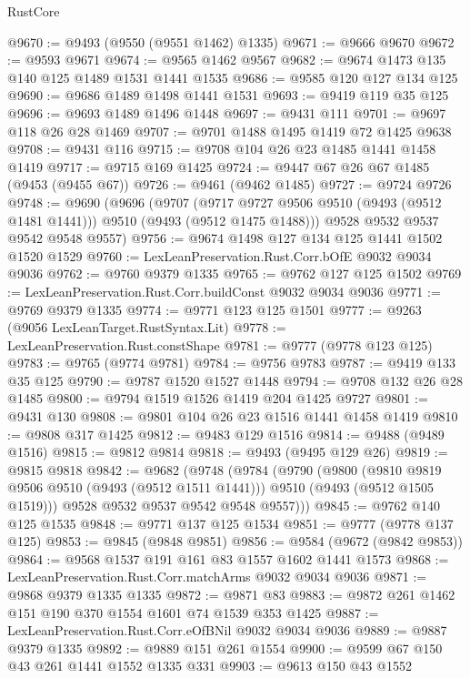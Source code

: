 \begin{lexlean}{RustCore}
\begin{coremodule}
@9670 := @9493 (@9550 (@9551 @1462) @1335)
@9671 := @9666 @9670
@9672 := @9593 @9671
@9674 := @9565 @1462 @9567
@9682 := @9674 @1473 @135 @140 @125 @1489 @1531 @1441 @1535
@9686 := @9585 @120 @127 @134 @125
@9690 := @9686 @1489 @1498 @1441 @1531
@9693 := @9419 @119 @35 @125
@9696 := @9693 @1489 @1496 @1448
@9697 := @9431 @111
@9701 := @9697 @118 @26 @28 @1469
@9707 := @9701 @1488 @1495 @1419 @72 @1425 @9638
@9708 := @9431 @116
@9715 := @9708 @104 @26 @23 @1485 @1441 @1458 @1419
@9717 := @9715 @169 @1425
@9724 := @9447 @67 @26 @67 @1485 (@9453 (@9455 @67))
@9726 := @9461 (@9462 @1485)
@9727 := @9724 @9726
@9748 := @9690
    (@9696
      (@9707
        (@9717 @9727 @9506 @9510 (@9493 (@9512 @1481 @1441)))
        @9510
        (@9493 (@9512 @1475 @1488)))
      @9528
      @9532
      @9537
      @9542
      @9548
      @9557)
@9756 := @9674 @1498 @127 @134 @125 @1441 @1502 @1520 @1529
@9760 := LexLeanPreservation.Rust.Corr.bOfE @9032 @9034 @9036
@9762 := @9760 @9379 @1335
@9765 := @9762 @127 @125 @1502
@9769 := LexLeanPreservation.Rust.Corr.buildConst @9032 @9034 @9036
@9771 := @9769 @9379 @1335
@9774 := @9771 @123 @125 @1501
@9777 := @9263 (@9056 LexLeanTarget.RustSyntax.Lit)
@9778 := LexLeanPreservation.Rust.constShape
@9781 := @9777 (@9778 @123 @125)
@9783 := @9765 (@9774 @9781)
@9784 := @9756 @9783
@9787 := @9419 @133 @35 @125
@9790 := @9787 @1520 @1527 @1448
@9794 := @9708 @132 @26 @28 @1485
@9800 := @9794 @1519 @1526 @1419 @204 @1425 @9727
@9801 := @9431 @130
@9808 := @9801 @104 @26 @23 @1516 @1441 @1458 @1419
@9810 := @9808 @317 @1425
@9812 := @9483 @129 @1516
@9814 := @9488 (@9489 @1516)
@9815 := @9812 @9814
@9818 := @9493 (@9495 @129 @26)
@9819 := @9815 @9818
@9842 := @9682
    (@9748
      (@9784
        (@9790
          (@9800
            (@9810 @9819 @9506 @9510 (@9493 (@9512 @1511 @1441)))
            @9510
            (@9493 (@9512 @1505 @1519)))
          @9528
          @9532
          @9537
          @9542
          @9548
          @9557)))
@9845 := @9762 @140 @125 @1535
@9848 := @9771 @137 @125 @1534
@9851 := @9777 (@9778 @137 @125)
@9853 := @9845 (@9848 @9851)
@9856 := @9584 (@9672 (@9842 @9853))
@9864 := @9568 @1537 @191 @161 @83 @1557 @1602 @1441 @1573
@9868 := LexLeanPreservation.Rust.Corr.matchArms @9032 @9034 @9036
@9871 := @9868 @9379 @1335 @1335
@9872 := @9871 @83
@9883 := @9872 @261 @1462 @151 @190 @370 @1554 @1601 @74 @1539 @353 @1425
@9887 := LexLeanPreservation.Rust.Corr.eOfBNil @9032 @9034 @9036
@9889 := @9887 @9379 @1335
@9892 := @9889 @151 @261 @1554
@9900 := @9599 @67 @150 @43 @261 @1441 @1552 @1335 @331
@9903 := @9613 @150 @43 @1552

\end{coremodule}
\end{lexlean}
